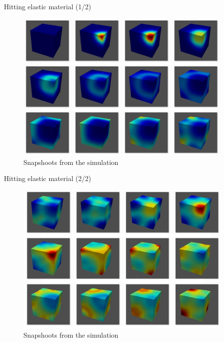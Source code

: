 \documentclass[c]{beamer}
\begin{document}
\begin{frame}{Hitting elastic material (1/2)}

    \begin{figure}
      \includegraphics[width=0.95\textwidth]{img/Figure4}
      \caption{Snapshoots from the simulation }
    \end{figure}


\end{frame}

\begin{frame}{Hitting elastic material (2/2)}

    \begin{figure}
      \includegraphics[width=0.95\textwidth]{img/Figure5}
      \caption{Snapshoots from the simulation }
    \end{figure}


\end{frame}
\end{document}
